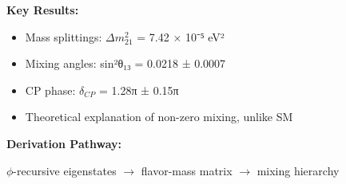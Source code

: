 \textbf{Key Results:}
\begin{itemize}
    \item Mass splittings: $\Delta m^2_{21}$ = 7.42 $\times$ 10⁻⁵ eV²
    \item Mixing angles: sin²θ₁₃ = 0.0218 ± 0.0007
    \item CP phase: $\delta_{CP}$ = 1.28π ± 0.15π
    \item Theoretical explanation of non-zero mixing, unlike SM
\end{itemize}

\textbf{Derivation Pathway:}

$\phi$-recursive eigenstates $\to$ flavor-mass matrix $\to$ mixing hierarchy